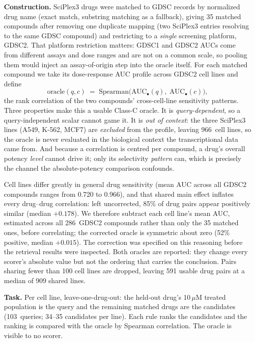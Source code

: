 \documentclass[11pt,letterpaper]{article}
\newcommand{\CTXLINES}{966}
\newcommand{\NGDSCDRUGS}{286}
\newcommand{\NCQUERIES}{103}
\begin{document}
\textbf{Construction.} SciPlex3 drugs were matched to GDSC records by normalized drug name (exact
match, substring matching as a fallback), giving 35 matched compounds after removing one
duplicate mapping (two SciPlex3 entries resolving to the same GDSC compound) and restricting to a
\emph{single} screening platform, GDSC2. That platform restriction matters: GDSC1 and GDSC2 AUCs
come from different assays and dose ranges and are not on a common scale, so pooling them would
inject an assay-of-origin step into the oracle itself. For each matched compound we take its
dose-response AUC profile across GDSC2 cell lines and define
\[
\mathrm{oracle}(q,c) \;=\; \mathrm{Spearman}\big(\mathrm{AUC}_{\bullet}(q),\;
\mathrm{AUC}_{\bullet}(c)\big),
\]
the rank correlation of the two compounds' cross-cell-line sensitivity patterns. Three properties
make this a usable Class-C oracle. It is \emph{query-dependent}, so a query-independent scalar
cannot game it. It is \emph{out of context}: the three SciPlex3 lines (A549, K-562, MCF7) are
\emph{excluded} from the profile, leaving \CTXLINES\ cell lines, so the oracle is never evaluated
in the biological context the transcriptional data came from. And because a correlation is
centred per compound, a drug's overall potency \emph{level} cannot drive it; only its selectivity
\emph{pattern} can, which is precisely the channel the absolute-potency comparison confounds.

Cell lines differ greatly in general drug sensitivity (mean AUC across all GDSC2 compounds ranges
from 0.720 to 0.966), and that shared main effect inflates every drug--drug correlation: left
uncorrected, 85\% of drug pairs appear positively similar (median $+0.178$). We therefore subtract
each cell line's mean AUC, estimated across all \NGDSCDRUGS\ GDSC2 compounds rather than only the
35 matched ones, before correlating; the corrected oracle is symmetric about zero (52\% positive,
median $+0.015$). The correction was specified on this reasoning before the retrieval results were
inspected. Both oracles are reported: they change every scorer's absolute value but not the
ordering that carries the conclusion. Pairs sharing fewer than 100 cell lines are dropped, leaving
591 usable drug pairs at a median of 909 shared lines.

\textbf{Task.} Per cell line, leave-one-drug-out: the held-out drug's 10\,$\mu$M treated
population is the query and the remaining matched drugs are the candidates (\NCQUERIES\ queries;
34--35 candidates per line). Each rule ranks the candidates and the ranking is compared with the
oracle by Spearman correlation. The oracle is visible to no scorer.
\end{document}
